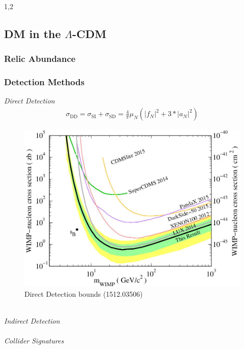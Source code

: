 \documentclass[11pt,a4paper,twoside]{article}
\numberwithin{equation}{section}
\begin{document}
\begin{spacing}{1,2}








\subsection{DM in the $\Lambda$-CDM}




\subsubsection{Relic Abundance}
\label{sec_RD}



\subsubsection{Detection Methods}
\label{sec_DMDetection}
\textit{Direct Detection} \\
\begin{align}
 \sigma_\text{DD} = \sigma_\text{SI} + \sigma_\text{SD} = \frac{4}{\pi}\mu_N \left(|f_N|^2 + 3*|a_N|^2\right)
 \label{eq_th.sigma.dd}
\end{align}
\begin{figure}[t]
 \includegraphics[width=\textwidth]{../pics/ddLux.jpeg}
 \caption{Direct Detection bounds (1512.03506)}
 \label{pic_ddbounds}
\end{figure}
\\ \textit{Indirect Detection} \\
\\ \textit{Collider Signatures}


\end{spacing}
\end{document}
